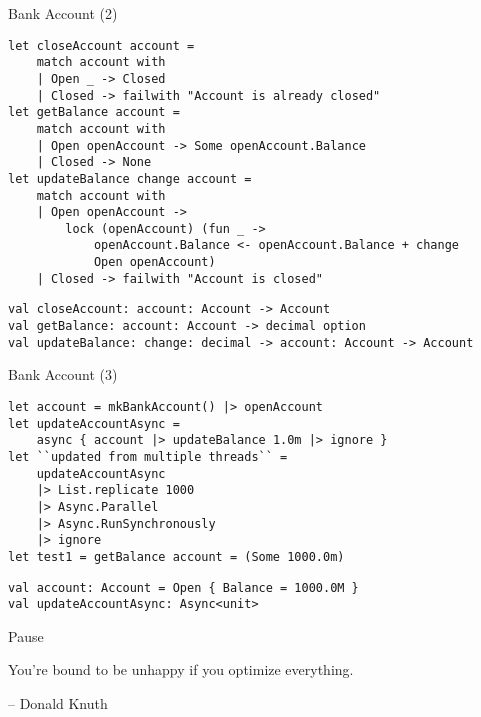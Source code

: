 \documentclass[t]{beamer}
\begin{document}
\begin{frame}[label={sec:org2a6fd98},fragile]{Bank Account (2)}
 \begin{verbatim}
let closeAccount account =
    match account with
    | Open _ -> Closed
    | Closed -> failwith "Account is already closed"
let getBalance account =
    match account with
    | Open openAccount -> Some openAccount.Balance
    | Closed -> None
let updateBalance change account =
    match account with
    | Open openAccount ->
        lock (openAccount) (fun _ ->
            openAccount.Balance <- openAccount.Balance + change
            Open openAccount)
    | Closed -> failwith "Account is closed"
\end{verbatim}

\begin{verbatim}
val closeAccount: account: Account -> Account
val getBalance: account: Account -> decimal option
val updateBalance: change: decimal -> account: Account -> Account
\end{verbatim}
\end{frame}

\begin{frame}[label={sec:orga2d43dc},fragile]{Bank Account (3)}
 \begin{verbatim}
let account = mkBankAccount() |> openAccount
let updateAccountAsync =        
    async { account |> updateBalance 1.0m |> ignore }
let ``updated from multiple threads`` =
    updateAccountAsync
    |> List.replicate 1000
    |> Async.Parallel 
    |> Async.RunSynchronously
    |> ignore
let test1 = getBalance account = (Some 1000.0m)
\end{verbatim}

\begin{verbatim}
val account: Account = Open { Balance = 1000.0M }
val updateAccountAsync: Async<unit>
\end{verbatim}
\end{frame}

\begin{frame}[label={sec:orgc90eee4}]{Pause}
\begin{block}{}
You’re bound to be unhappy if you optimize everything.

\null\hfill -- Donald Knuth
\end{block}
\end{frame}
\end{document}
